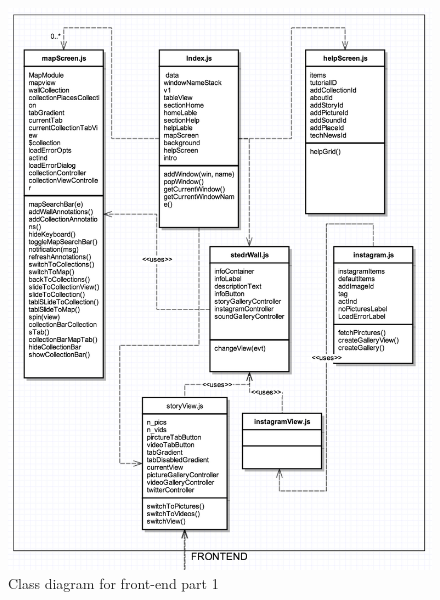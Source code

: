 \documentclass[12pt,a4paper,titlepage]{article}
\begin{document}
\begin{figure}[!h]
\centering
\includegraphics[width=1 \textwidth] {classFront1.png}
\caption{Class diagram for front-end part 1}
\end{figure}
\end{document}

